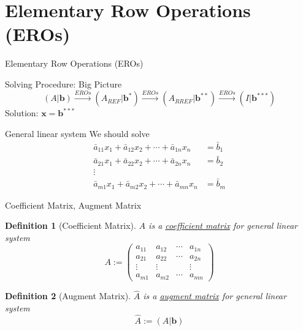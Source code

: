 \documentclass[final]{beamer}
\newtheorem{defn}{Definition}
\begin{document}
\section{Elementary Row Operations (EROs)} %
\label{sec:elementary_row_operations_eros}
\begin{frame}[t]{Elementary Row Operations (EROs)}
	\begin{block}
		{Solving Procedure: Big Picture}
		\[
			(A\vert \mathbf{b}) \xrightarrow{EROs} (A_{REF}\vert \mathbf{b}^\ast) \xrightarrow{EROs} (A_{RREF}\vert \mathbf{b}^{\ast\ast}) \xrightarrow{EROs} (I|\mathbf{b}^{\ast\ast\ast})
		\]
		Solution: $\mathbf{x} = \mathbf{b}^{\ast\ast\ast}$
	\end{block}
	\begin{block}
		{General linear system} We should solve 
		\begin{align*}
			\bar a_{11} x_1 + \bar a_{12}x_2 + \cdots + \bar a_{1n}x_n &= \bar b_1\\
			\bar a_{21} x_1 + \bar a_{22}x_2 + \cdots + \bar a_{2n}x_n &= \bar b_2\\
			\vdots\\
			\bar a_{m1} x_1 + \bar a_{m2}x_2 + \cdots + \bar a_{mn}x_n &= \bar b_m
		\end{align*}
	\end{block}
\end{frame}
\begin{frame}[t]{Coefficient Matrix, Augment Matrix}
	\begin{defn}
		[Coefficient Matrix]
		$A$ is a \uline{coefficient matrix} for general linear system
		\[
			A := \begin{pmatrix}
				a_{11}&a_{12}&\cdots& a_{1n}\\
				a_{21}&a_{22}&\cdots& a_{2n}\\
				\vdots&\vdots&&\vdots\\
				a_{m1}&a_{m2}&\cdots& a_{mn}
			\end{pmatrix}
		\]
	\end{defn}
	\begin{defn}
		[Augment Matrix]
		$\hat A$ is a \uline{augment matrix} for general linear system
		\[
			\hat A := (A\vert \mathbf{b}) 
		\]
	\end{defn}
\end{frame}
\end{document}
